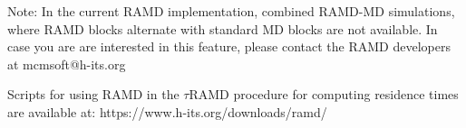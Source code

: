 Note: 
In the current RAMD implementation, combined RAMD-MD simulations, where RAMD blocks alternate with standard MD blocks are not available. In case you are are interested in this feature, please contact the RAMD developers at mcmsoft@h-its.org

Scripts for using RAMD in the $\tau$RAMD procedure for computing residence times are available at: https://www.h-its.org/downloads/ramd/
 

